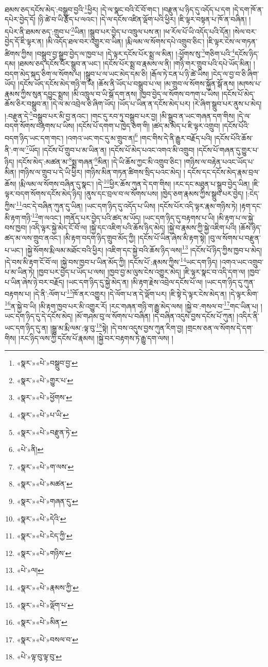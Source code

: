 ཐམས་ཅད་དངོས་མེད་:བསྒྲུབ་བྱའི་\footnote{«སྣར་»«པེ་»བསྒྲུབ་བྱ་}ཕྱིར། །དེ་ལ་སྣང་བའི་ངོ་བོ་གང་། །བརྫུན་པ་ཉིད་དུ་འདོད་པ་དག །དེ་དག་ཁོ་ན་དཔེར་བྱེད་དོ། །ཉི་ཚེ་བ་ཡི་རྩོད་པ་ལའང་། །དེ་ལ་དངོས་འཛིན་ལྡོག་པའི་ཕྱིར། །ཇི་ལྟར་བསྟན་པ་ཁོ་ན་བཞིན། །དཔེར་ནི་ཐམས་ཅད་:གྲུབ་པ་\footnote{«སྣར་»«པེ་»གྱུར་པ་}ཡིན། །སྒྲུབ་པར་བྱེད་པ་འཁྲུལ་པས་ན། །ཕ་རོལ་པོ་ཡི་འདོད་པའི་དོན། །སེལ་བར་བྱེད་དོ་ཇི་ལྟར་ན། །མི་འདོད་ཐལ་བར་འགྱུར་བ་ཡིན། །རྨི་ལམ་ལ་སོགས་དཔེ་འགྲུབ་ཅིང་། །ཇི་ལྟར་ངེས་ལ་གཏན་ཚིགས་ཀྱིས། །བསྒྲུབ་བྱ་སྒྲུབ་བྱེད་ལ་ཁྱབ་པ། །དེ་ལྟར་དངོས་པོར་སྨྲ་ལ་མིན། །:ཕྱོགས་སུ་\footnote{«སྣར་»«པེ་»ཕྱོགས་}གཅིག་པའི་\footnote{«སྣར་»«པེ་»པ་ཡི་}དངོས་ཉིད་དམ། །ཐམས་ཅད་དངོས་པོར་སྒྲུབ་ན་ཡང་། །དངོས་པོར་སྨྲ་བ་རྣམས་ལ་ནི། །གཉི་གར་གྲུབ་པའི་དཔེ་ཡོད་མིན། །བདག་མེད་སྐད་ཅིག་ལ་སོགས་པ། །སྒྲུབ་པ་ལ་ཡང་མེད་དམ་ཅི། །རྒོལ་ཏེ་ངན་པ་ཉི་ཚེ་ཡིས། །ངེད་ལ་བྱ་བ་ཅི་ཞིག་ཡོད། །དངོས་ཡོད་དངོས་མེད་གཉི་ག་ཡི། །ཆོས་ནི་ཡོད་པ་བསྒྲུབ་པ་ལ། །མ་གྲུབ་ལ་སོགས་སྐྱོན་སྒོ་ནས། །མཁས་པ་རྣམས་ཀྱིས་སུན་དབྱུང་སྨྲས། །མི་འཁྲུལ་བ་ཡི་སྒོ་དག་ནས། །ཁྱབ་བྱེད་ལ་སོགས་བཀག་པ་ཡིས། །དངོས་པོ་མེད་ཆོས་ཅིར་བསྒྲུབ་ན། །དེ་ལ་མ་འབྲེལ་ཅི་ཞིག་ཡོད། །ཡོད་པ་ཡིན་ན་དངོས་མེད་པར། །རེ་ཞིག་སྒྲུབ་པར་ནུས་པ་མེད། །:བརྫུན་དེ་\footnote{«སྣར་»«པེ་»བརྫུན་ཏེ་}བསྒྲུབ་པར་མི་བྱ་ནའང་། །གང་དུ་རབ་ཏུ་བསྒྲུབ་པར་བྱ། །མི་སྒྲུབ་ན་ཡང་གཞན་དག་གིས། །དེ་ལ་བདག་སོགས་བརྟགས་པ་ཡིས། །དངོས་པོ་དགག་པ་ཁྱེད་ཅག་གི། །ཚད་མ་མེད་པ་ཇི་ལྟར་འགྲུབ། །དངོས་པོའི་བདག་ཉིད་ཡང་དག་གང་། །འགའ་ཡང་གང་དུ་མ་གྲུབ་ན།\footnote{«པེ་»ནི།} །གང་གིས་དེ་ནི་རྒྱུར་བརྗོད་པའི། །དངོས་པོའི་ཆོས་ནི་:ག་ལ་\footnote{«སྣར་»«པེ་»ག་ལས་}ཡོད། །དངོས་པོ་གྲུབ་པ་མ་ཡིན་ན། །དངོས་པོ་མེད་པའང་འགའ་མི་འགྲུབ། །དངོས་པོ་གཞན་དུ་གྱུར་པ་ཉིད། །དངོས་མེད་:མཚན་མ་\footnote{«སྣར་»«པེ་»མཚན་}སྨྲ་གཞན་\footnote{«སྣར་»«པེ་»གཞན་དུ་}མིན། །དེ་ཡི་ཆོས་ཀྱང་མི་འགྲུབ་ཅིང་། །གཉིས་ལ་བརྟེན་པའང་ཡོད་པ་མིན། །གཉིས་ལ་གྲུབ་པ་དེ་ཡི་ཕྱིར། །གཉིས་མིན་གཏན་ཚིགས་སྲིད་པའང་མེད། །
དངོས་དང་དངོས་མེད་རྣམ་བྲལ་ཆོས། །རྨི་ལམ་ལ་སོགས་བཞིན་དུ་སྣང་། །དེ་\footnote{«སྣར་»«པེ་»དེའི་}ཕྱིར་ཆོས་ཀུན་དེ་དག་གིས། །རང་དང་མཐུན་པ་སྒྲུབ་བྱེད་ཡིན། །ཇི་ལྟར་བདག་སོགས་དངོས་མེད་ཉིད། །ནུས་དང་བྲལ་བ་ལ་སོགས་པས། །ཁྱེད་ཅག་རྣམས་ཀྱིས་སྒྲུབ་པར་བྱེད། །:ངེད་ཀྱིས་\footnote{«སྣར་»«པེ་»ངེད་ཀྱི་}འང་དེ་བཞིན་ཀུན་དུ་ཡིན། །ཡང་དག་ཉིད་དུ་འདོད་པ་ཡིས། །དངོས་པོར་འདི་ལྟར་རྣམ་གཉིས་ཏེ། །རྟག་དང་མི་རྟག་གཉི་\footnote{«སྣར་»«པེ་»གཉིས་}ག་ལའང་། །གནོད་པར་བྱེད་པའི་ཚད་མ་ཡོད། །ཡང་དག་ཉིད་དུ་བརྟགས་པ་ཡི། །མི་རྟག་པ་ལ་སྐྱེ་བས་ཁྱབ། །འདི་ལྟར་སྐྱེ་མེད་ངོ་བོ་ལ། །སྐྱེ་དང་འཇིག་པའི་ཆོས་ཉིད་མེད། །སྐྱེ་བ་རྣམས་ཀྱི་སྐྱེ་འཇིག་པའི། །ཆོས་ཉིད་ཚད་མ་ལས་གྲུབ་ནའང་། །མི་རྟག་བདག་ཉིད་གྲུབ་མོད་ཀྱི། །དངོས་པོ་ཡིན་ཞེས་མི་རྟག་སྟེ། །བུ་ལ་སོགས་པ་བརྫུན་པ་ཡང་། །སྐྱེ་སོགས་རྨི་ལམ་མཐོང་བའི་ཕྱིར། །འཇིག་དང་སྐྱེ་བའི་ཆོས་ཉིད་ལས།\footnote{«པེ་»ལ།} །དངོས་པོ་ཉིད་ཀྱིས་ཁྱབ་པ་མེད། །དེ་བས་མི་རྟག་ངོ་བོ་ལ། །སྐྱེ་བས་ཁྱབ་པ་ཡིན་མོད་ཀྱི། །དངོས་པོ་:རྣམས་ཀྱིས་\footnote{«སྣར་»«པེ་»རྣམས་ཀྱི་}ཡང་དག་ཉིད། །འགའ་ཡང་འགྲུབ་པ་མ་ཡིན་ཏེ། །ཁྱབ་པར་བྱེད་པ་ཡོད་པ་ལས། །ཁྱབ་བྱ་མ་ལུས་ངེས་འགྱུར་མེད། །ཇི་ལྟར་སྣང་བ་འདི་དག་ལ། །ཁྱབ་པ་ཡིན་ཞེས་ཉེ་བར་བརྗོད། །ཡང་དག་ཉིད་དུ་སྐྱེ་མེད་ན། །མི་རྟག་རྗེས་འབྲེལ་དངོས་པོ་ལ། །ཡང་དག་ཉིད་དུ་ཀུན་བརྟགས་པ། །དེ་ནི་:ལོག་པ་\footnote{«སྣར་»«པེ་»ལྡོག་པ་}ཁོ་ནར་འགྱུར། །དེ་ལོག་པ་ན་དེ་ལྡོག་པར། །ཇི་སྟེ་དེ་ལྟར་ངེས་མེད་ན། །དེ་ལྟར་མིག་\footnote{«སྣར་»«པེ་»མིན་}ན་སྐྱེ་བ་ཡི། །མི་རྟག་ཁྱབ་པར་མི་འགྱུར་རོ། །རང་གཞན་གཉི་ག་རྒྱུ་མེད་ལས། །སྐྱེ་བ་:གསལ་བ་\footnote{«སྣར་»«པེ་»བསལ་བ་}གང་ཡིན་པ། །ཡང་དག་ཉིད་དུ་དེ་དངོས་མེད། །མོ་གཤམ་བུ་ལ་སོགས་པ་བཞིན། །དེ་བཞིན་འདུས་བྱས་དངོས་པོ་ཀུན། །འདིར་ནི་ཡང་དག་ཉིད་དུ་ན། །སྒྱུ་མ་རྨི་ལམ་:ལྟ་བུ་\footnote{«པེ་»ལྟ་བུ་ལྟ་བུ་}སྟེ། །དེ་བས་འདུས་བྱས་ཀུན་རིག་བྱ། །གྲངས་ཅན་ལ་སོགས་དེ་དག་གིས། །རང་ཉིད་ལས་ཀྱི་དངོས་པོ་རྣམས། །སྐྱེ་བར་བརྟགས་ཏེ་རྒྱུ་དག་ལས། །
